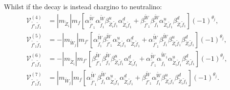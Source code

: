\documentclass[final,3p,times]{elsarticle}
\begin{document}
Whilst if the decay is instead chargino to neutralino:
\begin{align}
\mathcal{V}_{\tilde{f'}_1 \tilde{f}_1}^{(4)} &= |m_{\tilde{Z}_i}| m_{f} \left[\alpha_{\tilde{f'}_1}^{\tilde{W}} \alpha_{\tilde{f}_1}^{\tilde{W}} \beta_{\tilde{Z}_i \tilde{f}_1}^{u} \alpha_{\tilde{Z}_i \tilde{f}_1}^{d} + \beta_{\tilde{f'}_1}^{\tilde{W}} \beta_{\tilde{f}_1}^{\tilde{W}} \alpha_{\tilde{Z}_i \tilde{f}_1}^{u} \beta_{\tilde{Z}_i \tilde{f}_1}^{d}\right](-1)^{\theta_j} ,\\
\mathcal{V}_{\tilde{f'}_1 \tilde{f}_1}^{(5)} &= -|m_{\tilde{W}_j}|m_{f'} \left[\alpha_{\tilde{f}_1}^{\tilde{W}} \beta_{\tilde{f'}_1}^{\tilde{W}} \alpha_{\tilde{Z}_i \tilde{f}_1}^{u} \alpha_{\tilde{Z}_i \tilde{f}_1}^{d}  + \alpha_{\tilde{f'}_1}^{\tilde{W}} \beta_{\tilde{f}_1}^{\tilde{W}} \beta_{\tilde{Z}_i \tilde{f}_1}^{u} \beta_{\tilde{Z}_i \tilde{f}_1}^{d}\right](-1)^{\theta_j} ,\\
\mathcal{V}_{\tilde{f'}_1 \tilde{f}_1}^{(6)} &= -|m_{\tilde{Z}_i}| m_{f'}\left[\beta_{\tilde{f'}_1}^{\tilde{W}}\beta_{\tilde{f}_1}^{\tilde{W}} \beta_{\tilde{Z}_i \tilde{f}_1}^{u} \alpha_{\tilde{Z}_i \tilde{f}_1}^{d}  + \alpha_{\tilde{f'}_1}^{\tilde{W}} \alpha_{\tilde{f}_1}^{\tilde{W}_1} \alpha_{\tilde{Z}_i \tilde{f}_1}^{u} \beta_{\tilde{Z}_i \tilde{f}_1}^{d}\right](-1)^{\theta_j}, \\
\mathcal{V}_{\tilde{f'}_1 \tilde{f}_1}^{(7)} &= |m_{\tilde{W}_j}|m_{f}\left[\alpha_{\tilde{f'}_1}^{\tilde{W}}\beta_{\tilde{f}_1}^{\tilde{W}} \alpha_{\tilde{Z}_i \tilde{f}_1}^{u} \alpha_{\tilde{Z}_i \tilde{f}_1}^{d} + \beta_{\tilde{f'}_1}^{\tilde{W}} \alpha_{\tilde{f}_1}^{\tilde{W}} \beta_{\tilde{Z}_i \tilde{f}_1}^{u} \beta_{\tilde{Z}_i \tilde{f}_1}^{d}\right](-1)^{\theta_j}.
\end{align}
\end{document}
